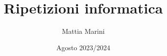 \endofdump
\usepackage{layouts}
\usepackage{tabularx}
\usepackage{makecell}\usetikzlibrary{patterns}
\usepackage{contour}

\usepackage{pgf-umlcd}

\makeatletter
\newcommand\HREF[2]{\hyper@linkurl{#2}{#1}}
\makeatother

\title{Ripetizioni informatica}
\author{Mattia Marini}
\date{Agosto 2023/2024}

\maketitle
{}
\tableofcontents
\listofexercises

\newpage
